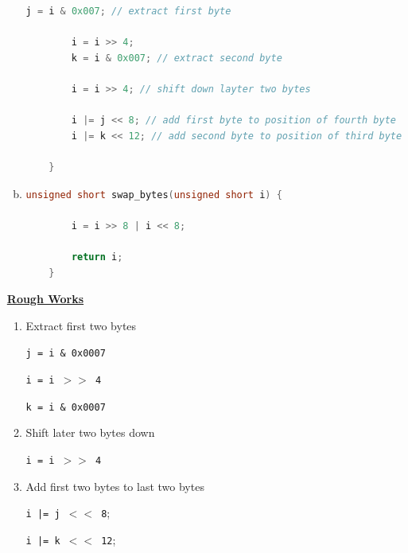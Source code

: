 \documentclass[12pt]{article}
\begin{document}
\begin{enumerate}[1.]
\begin{enumerate}[a)]
\begin{lstlisting}[language=c]
        j = i & 0x007; // extract first byte

        i = i >> 4;
        k = i & 0x007; // extract second byte

        i = i >> 4; // shift down layter two bytes

        i |= j << 8; // add first byte to position of fourth byte
        i |= k << 12; // add second byte to position of third byte

    }
\end{lstlisting}

        \item

\begin{lstlisting}[language=c]
    unsigned short swap_bytes(unsigned short i) {

        i = i >> 8 | i << 8;

        return i;
    }
\end{lstlisting}

    \end{enumerate}

    \bigskip

    \underline{\textbf{Rough Works}}

    \bigskip

    \begin{enumerate}[1.]
        \item Extract first two bytes

        \bigskip

        \texttt{j = i \& 0x0007}

        \texttt{i = i $>>$ 4}

        \texttt{k = i \& 0x0007}

        \bigskip

        \item Shift later two bytes down

        \bigskip

        \texttt{i = i $>>$ 4}

        \bigskip

        \item Add first two bytes to last two bytes

        \bigskip

        \texttt{i |= j $<<$ 8};

        \texttt{i |= k $<<$ 12};

        \bigskip

    \end{enumerate}

\end{enumerate}
\end{document}
